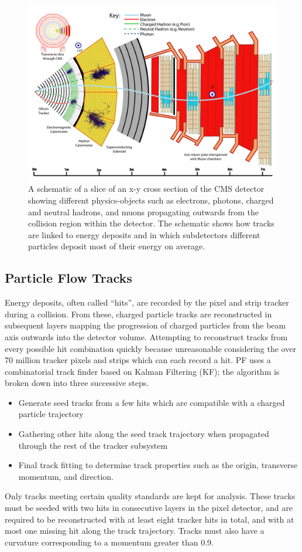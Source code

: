 \begin{figure}[htbp]
\centering
     \includegraphics[width=1.0\textwidth]{object_reconstruction_and_selection/plots/cms_slice.pdf}
     \caption{
A schematic of a slice of an x-y cross section of the CMS detector showing different
physics-objects such as electrons, photons, charged and neutral hadrons, and muons
propagating outwards from the collision region within the detector. The schematic
shows how tracks are linked to energy deposits and in which subdetectors different
particles deposit most of their energy on average.
     }
     \label{fig:cms_slice}
\end{figure}


\subsection{Particle Flow Tracks}
\label{sec:pf_tracks}
Energy deposits, often called ``hits'', are recorded by the pixel and strip tracker during
a collision. From these, charged particle tracks are reconstructed in subsequent layers
mapping the progression of charged particles from the beam axis outwards into the detector
volume. Attempting to reconstruct tracks from every possible hit combination quickly
because unreasonable considering the over 70 million tracker pixels and strips which can
each record a hit. PF uses a combinatorial track finder based on Kalman 
Filtering (KF); the algorithm is broken down into three successive steps.
\begin{itemize}
\item Generate seed tracks from a few hits which are compatible with a charged
particle trajectory
\item Gathering other hits along the seed track trajectory when propagated through
the rest of the tracker subsystem
\item Final track fitting to determine track properties such as the origin, transverse
momentum, and direction.
\end{itemize}
Only tracks meeting certain quality standards are kept for analysis. These tracks must
be seeded with two hits in consecutive layers in the pixel detector, and are required 
to be reconstructed with at least eight tracker hits in total, and with at most one 
missing hit along the track trajectory. Tracks must also have a curvature corresponding
to a momentum greater than 0.9\GeV.

